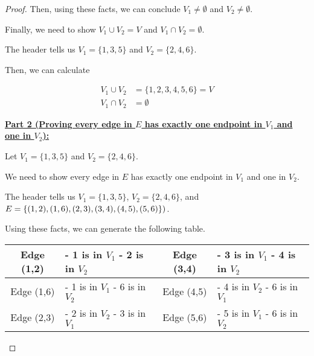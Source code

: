 \documentclass[12pt]{article}
\begin{document}
\begin{enumerate}[a.]
\begin{proof}
    \bigskip

    Then, using these facts, we can conclude $V_1 \neq \emptyset$ and
    $V_2 \neq \emptyset$.

    \bigskip

    Finally, we need to show $V_1 \cup V_2 = V$ and $V_1 \cap V_2 = \emptyset$.

    \bigskip

    The header tells us $V_1 = \{1,3,5\}$ and $V_2 = \{2,4,6\}$.

    \bigskip

    Then, we can calculate

    \begin{align}
        V_1 \cup V_2 &= \{1,2,3,4,5,6\} = V\\
        V_1 \cap V_2 &= \emptyset
    \end{align}

    \bigskip

    \ul{\textbf{Part 2 (Proving every edge in $E$ has exactly one endpoint
    in $V_1$ and\\ one in $V_2$):}}

    \bigskip

    Let $V_1 = \{1,3,5\}$ and $V_2 = \{2,4,6\}$.

    \bigskip

    We need to show every edge in $E$ has exactly one endpoint in $V_1$ and
    one in $V_2$.

    \bigskip

    The header tells us $V_1 = \{1,3,5\}$, $V_2 = \{2,4,6\}$,
    and $E = \{(1,2),(1,6),(2,3),\\(3,4),(4,5),(5,6)\})$.

    \bigskip

    Using these facts, we can generate the following table.

    \bigskip

    \begin{tabular}{|c|p{3cm}|c|p{3cm}|}
        \hline
        Edge (1,2) & - 1 is in $V_1$ \newline - 2 is in $V_2$ & Edge (3,4) & - 3 is in $V_1$ \newline - 4 is in $V_2$\\
        \hline
        Edge (1,6) & - 1 is in $V_1$ \newline - 6 is in $V_2$ & Edge (4,5) & - 4 is in $V_2$ \newline - 6 is in $V_1$\\
        \hline
        Edge (2,3) & - 2 is in $V_2$ \newline - 3 is in $V_1$ & Edge (5,6) & - 5 is in $V_1$ \newline - 6 is in $V_2$\\
        \hline
    \end{tabular}


\end{proof}
\end{enumerate}
\end{document}
